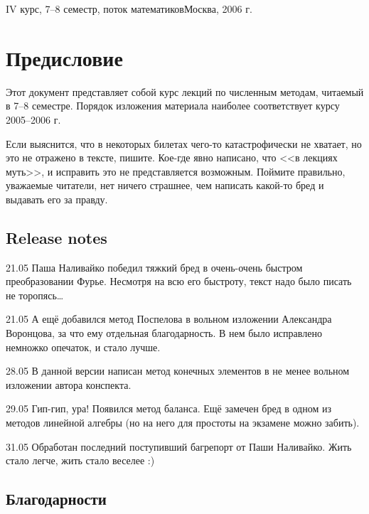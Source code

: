 \documentclass[a4paper]{article}
\begin{document}
{IV курс, 7--8 семестр, поток математиков}{Москва, 2006 г.}

\pagebreak
\tableofcontents

\pagebreak

\section*{Предисловие}


Этот документ представляет собой курс лекций по численным методам, читаемый в 7--8 семестре.
Порядок изложения материала наиболее соответствует курсу 2005--2006 г.

Если выяснится, что в некоторых билетах чего-то катастрофически не хватает, но это не отражено в тексте, пишите.
Кое-где явно написано, что <<в лекциях муть>>, и исправить это не представляется возможным.
Поймите правильно, уважаемые читатели, нет ничего страшнее, чем написать какой-то бред и выдавать его за правду.

\subsection*{Release notes}

\begin{items}{-2}
\item [21.05] Паша Наливайко победил тяжкий бред в очень-очень быстром преобразовании Фурье.
Несмотря на всю его быстроту, текст надо было писать не торопясь\dots
\item [21.05] А ещё добавился метод Поспелова в вольном изложении Александра Воронцова, за что ему отдельная благодарность.
В нем было исправлено немножко опечаток, и стало лучше.
\item [28.05] В данной версии написан метод конечных элементов в не менее вольном изложении автора конспекта.
\item [29.05] Гип-гип, ура! Появился метод баланса. Ещё замечен бред в одном из методов линейной алгебры
(но на него для простоты на экзамене можно забить).
\item [31.05] Обработан последний поступивший багрепорт от Паши Наливайко. Жить стало легче, жить стало веселее :)
\end{items}

\medskip

\subsection*{Благодарности}
\end{document}
